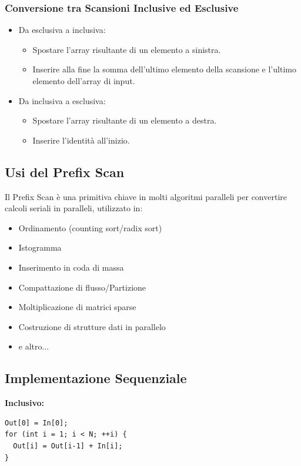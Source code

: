\subsubsection{Conversione tra Scansioni Inclusive ed Esclusive}
\begin{itemize}
  \item Da esclusiva a inclusiva:
  \begin{itemize}
    \item Spostare l'array risultante di un elemento a sinistra.
    \item Inserire alla fine la somma dell'ultimo elemento della
    scansione e l'ultimo elemento dell'array di input.
  \end{itemize}
  \item Da inclusiva a esclusiva:
  \begin{itemize}
    \item Spostare l'array risultante di un elemento a destra.
    \item Inserire l'identità all'inizio.
  \end{itemize}
\end{itemize}

\subsection{Usi del Prefix Scan}
Il Prefix Scan è una primitiva chiave in molti algoritmi paralleli
per convertire calcoli seriali in paralleli, utilizzato in:
\begin{itemize}
  \item Ordinamento (counting sort/radix sort)
  \item Istogramma
  \item Inserimento in coda di massa
  \item Compattazione di flusso/Partizione
  \item Moltiplicazione di matrici sparse
  \item Costruzione di strutture dati in parallelo
  \item e altro...
\end{itemize}

\subsection{Implementazione Sequenziale}
\textbf{Inclusivo:}
\begin{lstlisting}
Out[0] = In[0];
for (int i = 1; i < N; ++i) {
  Out[i] = Out[i-1] + In[i];
}
\end{lstlisting}

